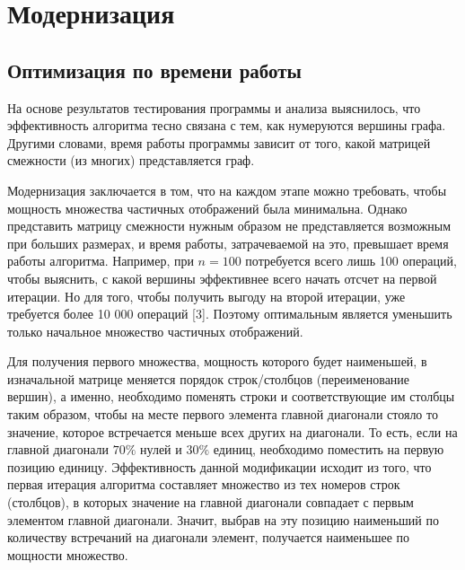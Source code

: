 \section{Модернизация}
\label{sec:AlgoModern_5} 
\large

\subsection{Оптимизация по времени работы}
На основе результатов тестирования программы и анализа выяснилось, что эффективность алгоритма тесно связана с тем, как нумеруются вершины графа. Другими словами, время работы программы зависит от того, какой матрицей смежности (из многих) представляется граф.

Модернизация заключается в том, что на каждом этапе можно требовать, чтобы мощность множества частичных отображений была минимальна. Однако представить матрицу смежности нужным образом не представляется возможным при больших размерах, и время работы, затрачеваемой на это, превышает время работы алгоритма. Например, при $n = 100$ потребуется всего лишь 100 операций, чтобы выяснить, с какой вершины эффективнее всего начать отсчет на первой итерации. Но для того, чтобы получить выгоду на второй итерации, уже требуется более 10 000 операций [3]. Поэтому оптимальным является уменьшить только начальное множество частичных отображений.

Для получения первого множества, мощность которого будет наименьшей, в
изначальной матрице меняется порядок строк/столбцов (переименование вершин), а
именно, необходимо поменять строки и соответствующие им столбцы таким образом,
чтобы на месте первого элемента главной диагонали стояло то значение, которое встречается меньше всех других на диагонали. То есть, если на главной диагонали $70\%$ нулей и $30\%$ единиц,
необходимо поместить на первую позицию единицу. Эффективность данной модификации
исходит из того, что первая итерация алгоритма составляет множество из тех номеров
строк (столбцов), в которых значение на главной диагонали совпадает с первым
элементом главной диагонали. Значит, выбрав на эту позицию наименьший по количеству встречаний на диагонали
элемент, получается наименьшее по мощности множество.

